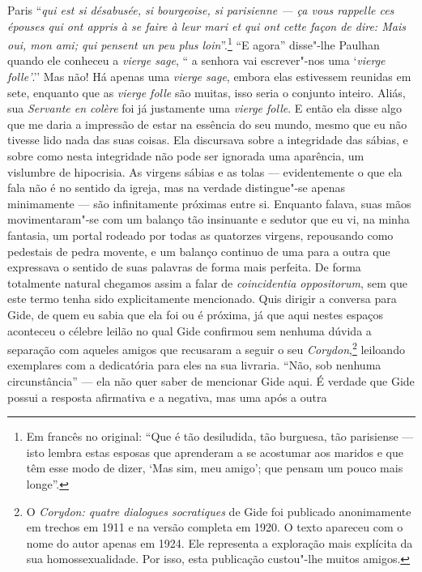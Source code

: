 Paris ``\emph{qui est si désabusée, si bourgeoise, si parisienne --- ça
vous rappelle ces épouses qui ont appris à se faire à leur mari et qui
ont cette façon de dire: Mais oui, mon ami; qui pensent un peu plus
loin}''.\footnote{Em francês no original: ``Que é tão desiludida, tão burguesa, tão
  parisiense --- isto lembra estas esposas que aprenderam a se acostumar
  aos maridos e que têm esse modo de dizer, `Mas sim, meu amigo'; que
  pensam um pouco mais longe''. \versal{[N. T.]}} ``E agora''
disse"-lhe Paulhan quando ele conheceu a \emph{vierge sage}, `` a senhora
vai escrever"-nos uma `\emph{vierge folle'}.'' Mas não! Há apenas uma
\emph{vierge sage}, embora elas estivessem reunidas em sete, enquanto
que as \emph{vierge folle} são muitas, isso seria o conjunto inteiro.
Aliás, sua \emph{Servante en colère} foi já justamente uma \emph{vierge
folle}. E então ela disse algo que me daria a impressão de estar na
essência do seu mundo, mesmo que eu não tivesse lido nada das suas
coisas. Ela discursava sobre a integridade das sábias, e sobre como
nesta integridade não pode ser ignorada uma aparência, um vislumbre de
hipocrisia. As virgens sábias e as tolas --- evidentemente o que ela fala
não é no sentido da igreja, mas na verdade distingue"-se apenas
minimamente --- são infinitamente próximas entre si. Enquanto falava,
suas mãos movimentaram"-se com um balanço tão insinuante e sedutor que eu
vi, na minha fantasia, um portal rodeado por todas as quatorzes virgens,
repousando como pedestais de pedra movente, e um balanço continuo de uma
para a outra que expressava o sentido de suas palavras de forma mais
perfeita. De forma totalmente natural chegamos assim a falar de
\emph{coincidentia oppositorum}, sem que este termo tenha sido
explicitamente mencionado. Quis dirigir a conversa para Gide, de quem eu
sabia que ela foi ou é próxima, já que aqui nestes espaços aconteceu o
célebre leilão no qual Gide confirmou sem nenhuma dúvida a separação com
aqueles amigos que recusaram a seguir o seu \emph{Corydon},\footnote{O \emph{Corydon: quatre dialogues socratiques} de Gide foi publicado
  anonimamente em trechos em 1911 e na versão completa em 1920. O texto
  apareceu com o nome do autor apenas em 1924. Ele representa a
  exploração mais explícita da sua homossexualidade. Por isso, esta
  publicação custou"-lhe muitos amigos. \versal{[N. E.]}} leiloando exemplares com a
dedicatória para eles na sua livraria. ``Não, sob nenhuma
circunstância'' --- ela não quer saber de mencionar Gide aqui. É verdade
que Gide possui a resposta afirmativa e a negativa, mas uma após a outra
